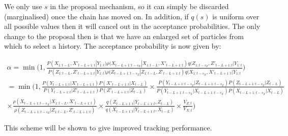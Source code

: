 We only use $s$ in the proposal mechanism, so it can simply be discarded (marginalised) once the chain has moved on. In addition, if $q(s)$ is uniform over all possible values then it will cancel out in the acceptance probabilities. The only change to the proposal then is that we have an enlarged set of particles from which to select a history. The acceptance probability is now given by:

\begin{multline}
\alpha = \min \bigg ( 1,  \frac{ P(X_{1:t-L}, X'_{t-L+1:t}|Y_{1:t}) \rho(X_{t-L+1:t-s_X}|X_{1:t-L}, X'_{t-L+1:t}) q(Z_{1:t-s_Z}, Z'_{t-L+1:t}|Y_{1:t} }{ P(Z_{1:t-L}, Z'_{t-L+1:t}|Y_{1:t}) \rho(Z_{t-L+1:t-s_Z}|Z_{1:t-L}, Z'_{t-L+1:t}) q(X_{1:t-s_X}, X'_{t-L+1:t}|Y_{1:t} }  \bigg ) \\
= \min \bigg ( 1,  \frac{ P(Y_{t-L+1:t}|X'_{t-L+1:t})P(X'_{t-L+1:t}|X_{t-L}) }{ P(Y_{t-L+1:t}|Z'_{t-L+1:t})P(Z'_{t-L+1:t}|Z_{t-L}) }
 \times \frac{ P(Y_{t-L+1:t-s_Z}|Z_{t-L+1:t-s_Z})P(Z_{t-L+1:t-s_Z}|Z_{t-L}) }{ P(Y_{t-L+1:t-s_X}|X_{t-L+1:t-s_X})P(X_{t-L+1:t-s_X}|X_{t-L}) } \\
 \times \frac{\rho(X_{t-L+1:t-s_X}|X_{1:t-L}, X'_{t-L+1:t})}{\rho(Z_{t-L+1:t-s_Z}|Z_{1:t-L}, Z'_{t-L+1:t})} \times \frac{q(Z_{t-L+1:t}|Y_{t-L+1:t}, Z_{t-L})}{q(X_{t-L+1:t}|Y_{t-L+1:t}, X_{t-L})} \times \frac{V_{Z,t}}{V_{X,t}}  \bigg )
\label{eq:FLAcceptance}
\end{multline}

This scheme will be shown to give improved tracking performance.